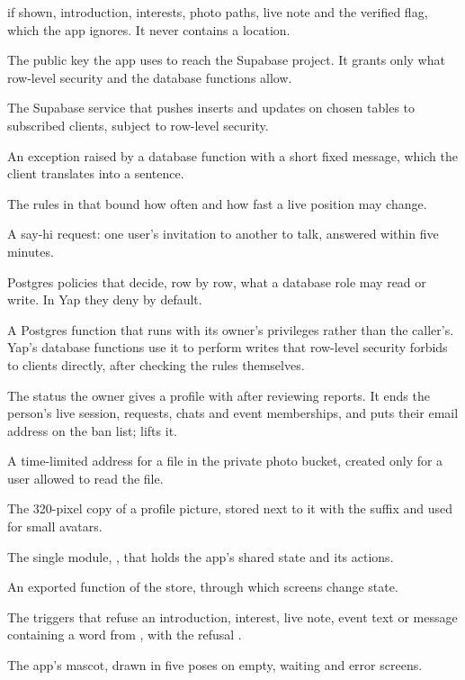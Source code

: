 \begin{description}[itemsep=4pt]
    if shown, introduction, interests, photo paths, live note and the verified flag, which the app ignores. It never contains a
    location.
  \item[Publishable key] The public key the app uses to reach the Supabase project. It grants only what
    row-level security and the database functions allow.
  \item[Realtime] The Supabase service that pushes inserts and updates on chosen tables to subscribed
    clients, subject to row-level security.
  \item[Refusal] An exception raised by a database function with a short fixed message, which the client
    translates into a sentence.
  \item[Relocation limits] The rules in  that bound how often and how fast a live position
    may change.
  \item[Request] A say-hi request: one user's invitation to another to talk, answered within five minutes.
  \item[Row-level security] Postgres policies that decide, row by row, what a database role may read or
    write. In Yap they deny by default.
  \item[\code{SECURITY DEFINER}] A Postgres function that runs with its owner's privileges rather than the
    caller's. Yap's database functions use it to perform writes that row-level security forbids to clients
    directly, after checking the rules themselves.
  \item[Suspended] The status the owner gives a profile with  after reviewing
    reports. It ends the person's live session, requests, chats and event memberships, and puts their email
    address on the ban list;  lifts it.
  \item[Signed URL] A time-limited address for a file in the private photo bucket, created only for a user
    allowed to read the file.
  \item[Small copy] The 320-pixel copy of a profile picture, stored next to it with the suffix
     and used for small avatars.
  \item[Store] The single module, , that holds the app's shared state and its
    actions.
  \item[Store action] An exported function of the store, through which screens change state.
  \item[Word filter] The triggers that refuse an introduction, interest, live note, event text or message
    containing a word from , with the refusal .
  \item[Yap cat] The app's mascot, drawn in five poses on empty, waiting and error screens.
\end{description}
